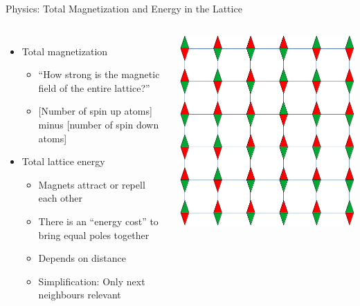 \begin{frame}{Physics: Total Magnetization and Energy in the Lattice}
%
\begin{columns}[T]
\begin{itemize}
\item Total magnetization
	\begin{itemize}
	\item \enquote{How strong is the magnetic field of the entire lattice?}
	\item {}[Number of spin up atoms] minus [number of spin down atoms]
	 \end{itemize} 
\item Total lattice energy
	\begin{itemize}
	\item Magnets attract or repell each other
	\item There is an \enquote{energy cost} to bring equal poles together
	\item Depends on distance
	\item Simplification: Only next neighbours relevant
	\end{itemize}
\end{itemize}
%
\includegraphics[width=.7\linewidth]{./gfx/spinLattice}
\end{columns}
%
\end{frame}


